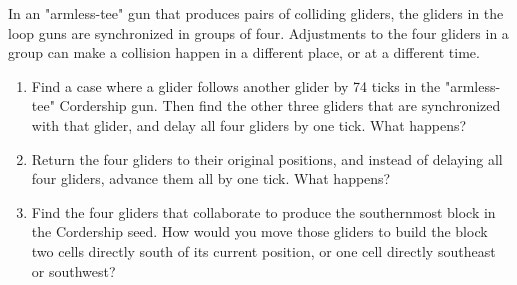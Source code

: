 \begin{multicols}{2}
\begin{problem}
\begin{enumerate}[label=\bf\color{ocre}(\alph*)]
	\end{enumerate}
\end{problem}


\mfilbreak


\begin{problem}\label{exer:slow_glider_pairs}
	In an "armless-tee" gun that produces pairs of colliding gliders, the gliders in the loop guns are synchronized in groups of four. Adjustments to the four gliders in a group can make a collision happen in a different place, or at a different time.
	\begin{enumerate}[label=\bf\color{ocre}(\alph*)]
        \item Find a case where a glider follows another glider by 74 ticks in the "armless-tee" Cordership gun. Then find the other three gliders that are synchronized with that glider, and delay all four gliders by one tick. What happens?
        \item Return the four gliders to their original positions, and instead of delaying all four gliders, advance them all by one tick.  What happens?
		\item Find the four gliders that collaborate to produce the southernmost block in the Cordership seed. How would you move those gliders to build the block two cells directly south of its current position, or one cell directly southeast or southwest?
	\end{enumerate}
\end{problem}



\end{multicols}
